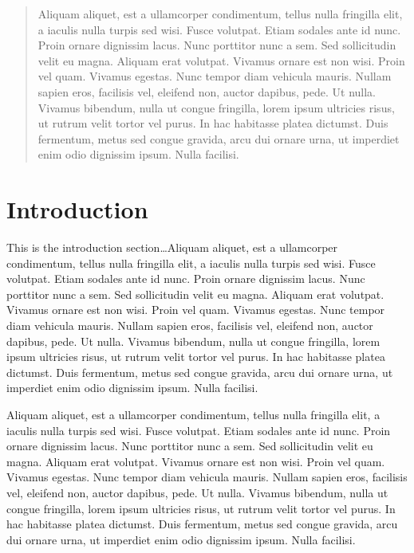 \documentclass[11pt]{article}
\begin{document}
\newpage
\thispagestyle{empty}
\begin{abstract}
\vspace{-0.2in}
Aliquam aliquet, est a ullamcorper condimentum, tellus nulla fringilla elit, a iaculis nulla turpis sed wisi. Fusce volutpat. Etiam sodales ante id nunc. Proin ornare dignissim lacus. Nunc porttitor nunc a sem. Sed sollicitudin velit eu magna. Aliquam erat volutpat. Vivamus ornare est non wisi. Proin vel quam. Vivamus egestas. Nunc tempor diam vehicula mauris. Nullam sapien eros, facilisis vel, eleifend non, auctor dapibus, pede. Ut nulla. Vivamus bibendum, nulla ut congue fringilla, lorem ipsum ultricies risus, ut rutrum velit tortor vel purus. In hac habitasse platea dictumst. Duis fermentum, metus sed congue gravida, arcu dui ornare urna, ut imperdiet enim odio dignissim ipsum. Nulla facilisi.
\end{abstract} 

\newpage
\setcounter{page}{1} %
\section{Introduction}
\label{sec:intro}
\vspace{-0.2in}
%
This is the introduction section\ldots Aliquam aliquet, est a ullamcorper condimentum, tellus nulla fringilla elit, a iaculis nulla turpis sed wisi. Fusce volutpat. Etiam sodales ante id nunc. Proin ornare dignissim lacus. Nunc porttitor nunc a sem. Sed sollicitudin velit eu magna. Aliquam erat volutpat. Vivamus ornare est non wisi. Proin vel quam. Vivamus egestas. Nunc tempor diam vehicula mauris. Nullam sapien eros, facilisis vel, eleifend non, auctor dapibus, pede. Ut nulla. Vivamus bibendum, nulla ut congue fringilla, lorem ipsum ultricies risus, ut rutrum velit tortor vel purus. In hac habitasse platea dictumst. Duis fermentum, metus sed congue gravida, arcu dui ornare urna, ut imperdiet enim odio dignissim ipsum. Nulla facilisi. 

Aliquam aliquet, est a ullamcorper condimentum, tellus nulla fringilla elit, a iaculis nulla turpis sed wisi. Fusce volutpat. Etiam sodales ante id nunc. Proin ornare dignissim lacus. Nunc porttitor nunc a sem. Sed sollicitudin velit eu magna. Aliquam erat volutpat. Vivamus ornare est non wisi. Proin vel quam. Vivamus egestas. Nunc tempor diam vehicula mauris. Nullam sapien eros, facilisis vel, eleifend non, auctor dapibus, pede. Ut nulla. Vivamus bibendum, nulla ut congue fringilla, lorem ipsum ultricies risus, ut rutrum velit tortor vel purus. In hac habitasse platea dictumst. Duis fermentum, metus sed congue gravida, arcu dui ornare urna, ut imperdiet enim odio dignissim ipsum. Nulla facilisi. 
\end{document}
